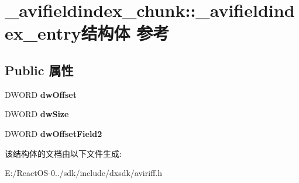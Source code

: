\hypertarget{struct__avifieldindex__chunk_1_1__avifieldindex__entry}{}\section{\+\_\+avifieldindex\+\_\+chunk\+:\+:\+\_\+avifieldindex\+\_\+entry结构体 参考}
\label{struct__avifieldindex__chunk_1_1__avifieldindex__entry}
\subsection*{Public 属性}
\begin{DoxyCompactItemize}
\item 
\mbox{\label{struct__avifieldindex__chunk_1_1__avifieldindex__entry_a0d31f08d215e84ce904a2f19f858efde}} 
D\+W\+O\+RD {\bfseries dw\+Offset}
\item 
\mbox{\label{struct__avifieldindex__chunk_1_1__avifieldindex__entry_a76283d95dd3444ec65d83dab2ec8650d}} 
D\+W\+O\+RD {\bfseries dw\+Size}
\item 
\mbox{\label{struct__avifieldindex__chunk_1_1__avifieldindex__entry_a55242af2ff0637a3aa4c85961832dcd5}} 
D\+W\+O\+RD {\bfseries dw\+Offset\+Field2}
\end{DoxyCompactItemize}


该结构体的文档由以下文件生成\+:\begin{DoxyCompactItemize}
\item 
E\+:/\+React\+O\+S-\/0../sdk/include/dxsdk/aviriff.\+h\end{DoxyCompactItemize}
